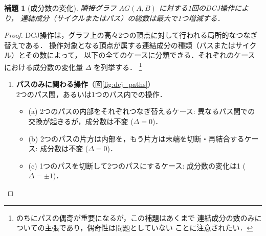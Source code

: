 \documentclass[paper=a4,fontsize=11pt,report,oneside]{jlreq}
\newtheorem{lemma}[theorem]{補題}
\begin{document}
\begin{lemma}[成分数の変化]
\label{lem:comp_change}
隣接グラフ $AG(A, B)$ に対する1回のDCJ操作により，
連結成分（サイクルまたはパス）の総数は最大で1つ増減する．
\end{lemma}

\begin{proof}
DCJ操作は，グラフ上の高々2つの頂点に対して行われる局所的なつなぎ替えである．
操作対象となる頂点が属する連結成分の種類（パスまたはサイクル）とその数によって，
以下の全てのケースに分類できる．それぞれのケースにおける成分数の変化量 $\Delta$ を列挙する．
\footnote{
    のちにパスの偶奇が重要になるが，この補題はあくまで
    連結成分の数のみについての主張であり，偶奇性は問題としていない
    ことに注意されたい．
}

\begin{enumerate}
\item \textbf{パスのみに関わる操作}（図\ref{fig:dcj_paths}）\\
2つのパス間，あるいは1つのパス内での操作．
\begin{itemize}
    \item (a) 2つのパスの内部をそれぞれつなぎ替えるケース: 異なるパス間での交換が起きるが，成分数は不変 ($\Delta=0$)．
    \item (b) 2つのパスの片方は内部を，もう片方は末端を切断・再結合するケース: 成分数は不変 ($\Delta=0$)．
    \item (c) 1つのパスを切断して2つのパスにするケース: 成分数の変化は1 ($\Delta=\pm 1$)．
\end{itemize}

\begin{figure}[H]
    \centering
\end{figure}
\end{enumerate}
\end{proof}
\end{document}

